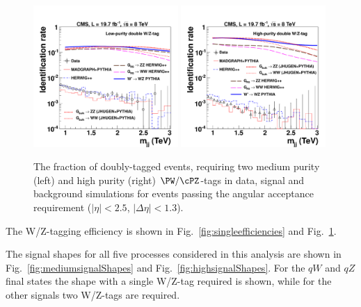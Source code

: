 \begin{figure}[htb]
\begin{center}
\includegraphics[width=0.49\textwidth]{figs/signal-acc-eff/double-tagging-eff-medium.pdf}
\includegraphics[width=0.49\textwidth]{figs/signal-acc-eff/double-tagging-eff.pdf}
\end{center}
\caption{The fraction of doubly-tagged events, requiring two medium purity (left) 
and high purity (right) $\PW/\cPZ$-tags in data,
  signal and background simulations for events passing the angular acceptance
  requirement ($|\eta| < 2.5$, $|\Delta\eta|<1.3$).}
\label{fig:doubleefficiencies}
\end{figure}
%


The W/Z-tagging efficiency is shown in Fig.~\ref{fig:singleefficiencies} and Fig.~\ref{fig:doubleefficiencies}.


The signal shapes for all five processes considered in this analysis are shown in Fig.~\ref{fig:mediumsignalShapes} and Fig.~\ref{fig:highsignalShapes}.  
For the $qW$ and $qZ$ final states the shape with a single W/Z-tag required is shown, while for the other signals two W/Z-tags are required.


